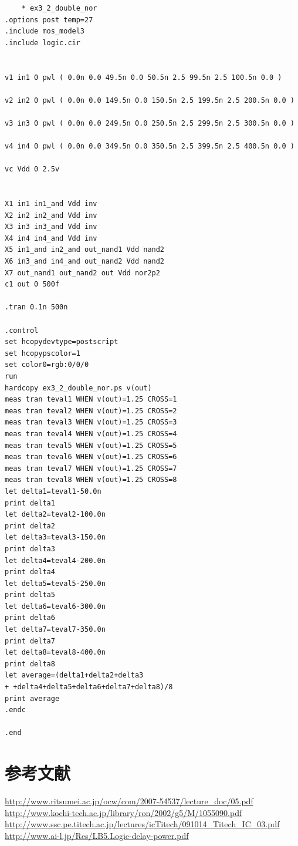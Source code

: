 \documentclass{jsarticle}
\begin{document}
\begin{lstlisting}
    * ex3_2_double_nor
.options post temp=27
.include mos_model3
.include logic.cir


v1 in1 0 pwl ( 0.0n 0.0 49.5n 0.0 50.5n 2.5 99.5n 2.5 100.5n 0.0 )

v2 in2 0 pwl ( 0.0n 0.0 149.5n 0.0 150.5n 2.5 199.5n 2.5 200.5n 0.0 )

v3 in3 0 pwl ( 0.0n 0.0 249.5n 0.0 250.5n 2.5 299.5n 2.5 300.5n 0.0 )

v4 in4 0 pwl ( 0.0n 0.0 349.5n 0.0 350.5n 2.5 399.5n 2.5 400.5n 0.0 )

vc Vdd 0 2.5v


X1 in1 in1_and Vdd inv
X2 in2 in2_and Vdd inv
X3 in3 in3_and Vdd inv
X4 in4 in4_and Vdd inv
X5 in1_and in2_and out_nand1 Vdd nand2
X6 in3_and in4_and out_nand2 Vdd nand2
X7 out_nand1 out_nand2 out Vdd nor2p2
c1 out 0 500f

.tran 0.1n 500n

.control
set hcopydevtype=postscript
set hcopypscolor=1
set color0=rgb:0/0/0
run
hardcopy ex3_2_double_nor.ps v(out)
meas tran teval1 WHEN v(out)=1.25 CROSS=1
meas tran teval2 WHEN v(out)=1.25 CROSS=2
meas tran teval3 WHEN v(out)=1.25 CROSS=3
meas tran teval4 WHEN v(out)=1.25 CROSS=4
meas tran teval5 WHEN v(out)=1.25 CROSS=5
meas tran teval6 WHEN v(out)=1.25 CROSS=6
meas tran teval7 WHEN v(out)=1.25 CROSS=7
meas tran teval8 WHEN v(out)=1.25 CROSS=8
let delta1=teval1-50.0n
print delta1
let delta2=teval2-100.0n
print delta2
let delta3=teval3-150.0n
print delta3
let delta4=teval4-200.0n
print delta4
let delta5=teval5-250.0n
print delta5
let delta6=teval6-300.0n
print delta6
let delta7=teval7-350.0n
print delta7
let delta8=teval8-400.0n
print delta8
let average=(delta1+delta2+delta3
+ +delta4+delta5+delta6+delta7+delta8)/8
print average
.endc

.end

\end{lstlisting}


\section{参考文献}
\begin{flushleft}
    \url{http://www.ritsumei.ac.jp/ocw/com/2007-54537/lecture_doc/05.pdf}
    \url{http://www.kochi-tech.ac.jp/library/ron/2002/g5/M/1055090.pdf}
    \url{http://www.ssc.pe.titech.ac.jp/lectures/icTitech/091014_Titech_IC_03.pdf}
    \url{http://www.ai-l.jp/Res/LB5.Logic-delay-power.pdf}
\end{flushleft}
\end{document}
